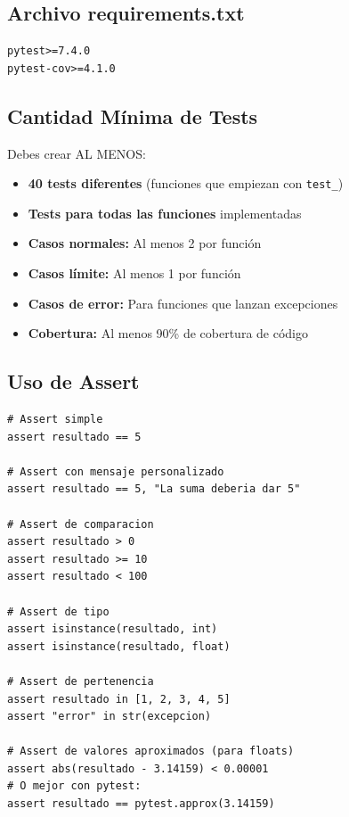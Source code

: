 \documentclass[12pt,a4paper]{article}
\begin{document}
\subsection{Archivo requirements.txt}

\begin{lstlisting}[caption=requirements.txt]
pytest>=7.4.0
pytest-cov>=4.1.0
\end{lstlisting}

\subsection{Cantidad Mínima de Tests}

Debes crear AL MENOS:

\begin{itemize}[leftmargin=*]
    \item \textbf{40 tests diferentes} (funciones que empiezan con \texttt{test\_})
    \item \textbf{Tests para todas las funciones} implementadas
    \item \textbf{Casos normales:} Al menos 2 por función
    \item \textbf{Casos límite:} Al menos 1 por función
    \item \textbf{Casos de error:} Para funciones que lanzan excepciones
    \item \textbf{Cobertura:} Al menos 90\% de cobertura de código
\end{itemize}

\subsection{Uso de Assert}

\begin{lstlisting}[caption=Diferentes formas de assert]
# Assert simple
assert resultado == 5

# Assert con mensaje personalizado
assert resultado == 5, "La suma deberia dar 5"

# Assert de comparacion
assert resultado > 0
assert resultado >= 10
assert resultado < 100

# Assert de tipo
assert isinstance(resultado, int)
assert isinstance(resultado, float)

# Assert de pertenencia
assert resultado in [1, 2, 3, 4, 5]
assert "error" in str(excepcion)

# Assert de valores aproximados (para floats)
assert abs(resultado - 3.14159) < 0.00001
# O mejor con pytest:
assert resultado == pytest.approx(3.14159)
\end{lstlisting}
\end{document}
